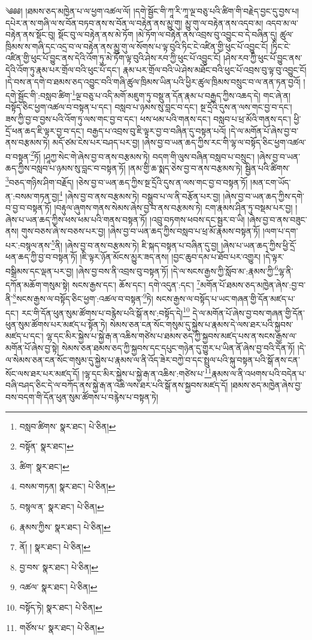 \setcounter{footnote}{0} 
༄༅༅། །ཐམས་ཅད་མཁྱེན་པ་ལ་ཕྱག་འཚལ་ལོ། །དགེ་སྦྱོང་གི་ཀཱ་རི་ཀཱ་ལྔ་བཅུ་པའི་ཚིག་གི་བརྗེད་བྱང་དུ་བྱས་པ། དཔེར་ན་ས་གཞི་ལ་ས་བོན་བཏབ་ནས་ས་བོན་ལ་བརྟེན་ནས་མྱུ་གུ། མྱུ་གུ་ལ་བརྟེན་ནས་འདབ་མ། འདབ་མ་ལ་བརྟེན་ནས་སྡོང་བུ། སྡོང་བུ་ལ་བརྟེན་ནས་མེ་ཏོག །མེ་ཏོག་ལ་བརྟེན་ནས་འབྲས་བུ་འབྱུང་བ་དེ་བཞིན་དུ། ཚུལ་ཁྲིམས་ས་གཞི་དང་འདྲ་བ་ལ་བརྟེན་ནས་མྱུ་གུ་ལ་སོགས་པ་ལྟ་བུའི་ཏིང་ངེ་འཛིན་གྱི་ཕུང་པོ་འབྱུང་ངོ། །ཏིང་ངེ་འཛིན་གྱི་ཕུང་པོ་བྱུང་ནས་དེའི་འོག་ཏུ་མེ་ཏོག་ལྟ་བུའི་ཤེས་རབ་ཀྱི་ཕུང་པོ་འབྱུང་ངོ། །ཤེས་རབ་ཀྱི་ཕུང་པོ་བྱུང་ནས་དེའི་འོག་ཏུ་རྣམ་པར་གྲོལ་བའི་ཕུང་པོ་དང་། རྣམ་པར་གྲོལ་བའི་ཡེ་ཤེས་མཐོང་བའི་ཕུང་པོ་འབྲས་བུ་ལྟ་བུ་འབྱུང་ངོ། །དེ་བས་ན་དགེ་བ་ཐམས་ཅད་འབྱུང་བའི་གཞི་ཚུལ་ཁྲིམས་ཡིན་པའི་ཕྱིར་ཚུལ་ཁྲིམས་བསྲུང་བ་ལ་ནན་ཏན་བྱའོ། །དགེ་སྦྱོང་གི་:བསླབ་ཚིག་\footnote{བསླབ་ཚིགས་  སྣར་ཐང་།  པེ་ཅིན། }ལྔ་བཅུ་པ་འདི་མགོ་མཇུག་ཏུ་བསྡུ་ན་དོན་རྣམ་པ་བརྒྱད་ཀྱིས་འཆད་དེ། གང་ཞེ་ན། བསྟོད་ཅིང་ཕྱག་འཚལ་བ་བསྟན་པ་དང་། བསླབ་པ་ཉམས་སུ་བླང་བ་དང་། སྔ་དྲོའི་དུས་ན་ལས་གང་བྱ་བ་དང་། ཟས་ཀྱི་བྱ་བ་བྱས་པའི་འོག་ཏུ་ལས་གང་བྱ་བ་དང་། ཕས་ཕམ་པའི་གནས་དང་། བསླབ་པ་ཕྲ་མོའི་གནས་དང་། ཕྱི་དྲོ་ཕན་ཆད་ཇི་ལྟར་བྱ་བ་དང་། བརྒྱད་པ་འབྲས་བུ་ཇི་ལྟར་བྱ་བ་བཞིན་དུ་བསྟན་པའོ། །དེ་ལ་མགོན་པོ་ཞེས་བྱ་བ་ནས་བརྩམས་ཏེ། མདོ་ཙམ་ངེས་པར་བཤད་པར་བྱ། །ཞེས་བྱ་བ་ཡན་ཆད་ཀྱིས་རང་གི་ལྷ་ལ་བསྟོད་ཅིང་ཕྱག་འཚལ་བ་བསྟན་\footnote{བསྟོན་  སྣར་ཐང་། }ཏོ། །ཤཱཀྱ་སེང་གེ་ཞེས་བྱ་བ་ནས་བརྩམས་ཏེ། བདག་གི་ལུས་བཞིན་བསླབ་པ་བསྲུང་། །ཞེས་བྱ་བ་ཡན་ཆད་ཀྱིས་བསླབ་པ་ཉམས་སུ་བླང་བ་བསྟན་ཏོ། །ནམ་གྱི་ཆ་སྨད་ཅེས་བྱ་བ་ནས་བརྩམས་ཏེ། སྦྱིན་པའི་ཚིགས་\footnote{ཚིག་  སྣར་ཐང་། }བཅད་གཉིས་ཤིག་བརྗོད། །ཅེས་བྱ་བ་ཡན་ཆད་ཀྱིས་སྔ་དྲོའི་དུས་ན་ལས་གང་བྱ་བ་བསྟན་ཏོ། །མན་ངག་ཡོད་ན་:བསམ་གཏན་བྱ།\footnote{བསམ་གཏན།  སྣར་ཐང་།  པེ་ཅིན། } །ཞེས་བྱ་བ་ནས་བརྩམས་ཏེ། བསྒྲུབ་པ་ལ་ནི་བརྩོན་པར་བྱ། །ཞེས་བྱ་བ་ཡན་ཆད་ཀྱིས་དགེ་བ་བྱ་བ་བསྟན་ཏོ། །བརྟུལ་ཞུགས་གནས་སེམས་ཞེས་བྱ་བ་ནས་བརྩམས་ཏེ། ངག་རྣམས་ཤིན་ཏུ་བསྡམ་པར་བྱ། །ཞེས་པ་ཡན་ཆད་ཀྱིས་ཕས་ཕམ་པའི་གནས་བསྟན་ཏོ། །འབྲུ་བཏགས་ཕབས་དང་སྦྱར་བ་ཡི། །ཞེས་བྱ་བ་ནས་བཟུང་ནས། གུས་བཅས་ཞེ་ས་བཅས་པར་བྱ། །ཞེས་བྱ་བ་ཡན་ཆད་ཀྱིས་བསླབ་པ་ཕྲ་མོ་རྣམས་བསྟན་ཏོ། །ལག་པ་དག་པར་:བསྙལ་ནས་\footnote{བསྙལ་ན་  སྣར་ཐང་།  པེ་ཅིན། }ནི། །ཞེས་བྱ་བ་ནས་བརྩམས་ཏེ། ཇི་སྐད་བསྟན་པ་བཞིན་དུ་བྱ། །ཞེས་པ་ཡན་ཆད་ཀྱིས་ཕྱི་དྲོ་ཕན་ཆད་ཀྱི་བྱ་བ་བསྟན་ཏོ། །ཇི་ལྟར་ཉོན་མོངས་མྱུར་ཟད་ནས། །བྱང་ཆུབ་དམ་པ་ཐོབ་པར་འགྱུར། །དེ་ལྟར་བསྒྲིམས་དང་ལྡན་པར་བྱ། །ཞེས་བྱ་བས་ནི་འབྲས་བུ་བསྟན་ཏོ། །དེ་ལ་སངས་རྒྱས་ཀྱི་སློབ་མ་:རྣམས་ཀྱི་\footnote{རྣམས་ཀྱིས་  སྣར་ཐང་།  པེ་ཅིན། }ལྷ་ནི་དཀོན་མཆོག་གསུམ་སྟེ། སངས་རྒྱས་དང་། ཆོས་དང་། དགེ་འདུན་:དང་། \footnote{ནོ། །   སྣར་ཐང་།  པེ་ཅིན། }མགོན་པོ་ཐམས་ཅད་མཁྱེན་ཞེས་:བྱ་བ་ནི་\footnote{བྱ་བས་  སྣར་ཐང་།  པེ་ཅིན། }སངས་རྒྱས་ལ་བསྟོད་ཅིང་ཕྱག་:འཚལ་བ་བསྟན་\footnote{འཚལ་  སྣར་ཐང་།  པེ་ཅིན། }ཏེ། སངས་རྒྱས་ལ་བསྟོད་པ་ཡང་གཞན་གྱི་དོན་མཛད་པ་དང་། རང་གི་དོན་ཕུན་སུམ་ཚོགས་པ་བརྙེས་པའི་སྒོ་ནས་:བསྟོད་དེ།\footnote{བསྟོད་ཏེ།  སྣར་ཐང་།  པེ་ཅིན། } དེ་ལ་མགོན་པོ་ཞེས་བྱ་བས་གཞན་གྱི་དོན་ཕུན་སུམ་ཚོགས་པར་མཛད་པ་སྟོན་ཏེ། སེམས་ཅན་ངན་སོང་གསུམ་དུ་སྐྱེས་པ་རྣམས་དེ་ལས་ཐར་པའི་སྐྱབས་མཛད་པ་དང་། ལྷ་དང་མིར་སྐྱེས་པ་སྐྱེ་རྒ་ན་འཆིས་གཙེས་པ་ཐམས་ཅད་ཀྱི་སྐྱབས་མཛད་པས་ན་སངས་རྒྱས་ལ་མགོན་པོ་ཞེས་བྱ་སྟེ། སེམས་ཅན་ཐམས་ཅད་ཀྱི་སྐྱབས་དང་དཔུང་གཉེན་དུ་གྱུར་པ་ཡིན་ནོ་ཞེས་བྱ་བའི་དོན་ཏོ། །དེ་ལ་སེམས་ཅན་ངན་སོང་གསུམ་དུ་སྐྱེས་པ་རྣམས་ལ་ནི་འོད་ཟེར་བཀྱེ་བ་དང་སྤྲུལ་པའི་སྐུ་བསྟན་པའི་སྒོ་ནས་ངན་སོང་ལས་ཐར་པར་མཛད་དོ། །ལྷ་དང་མིར་སྐྱེས་པ་སྐྱེ་རྒ་ན་འཆིས་:གཙེས་པ་\footnote{གཙོས་པ་  སྣར་ཐང་།  པེ་ཅིན། }རྣམས་ལ་ནི་འཕགས་པའི་བདེན་པ་བཞི་བཤད་ཅིང་དེ་ལ་བཀོད་ནས་སྐྱེ་རྒ་ན་འཆི་ལས་ཐར་པའི་སྒོ་ནས་སྐྱབས་མཛད་དོ། །ཐམས་ཅད་མཁྱེན་ཞེས་བྱ་བས་བདག་གི་དོན་ཕུན་སུམ་ཚོགས་པ་བརྙེས་པ་བསྟན་ཏེ། 